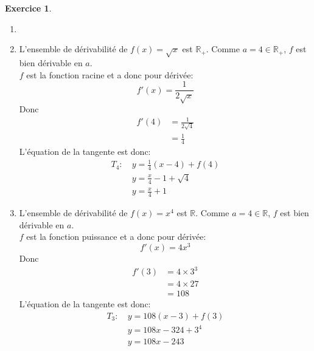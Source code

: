 \documentclass{exam}
\theoremstyle{definition}
\newtheorem{exercice}{Exercice}
\begin{document}
\begin{exercice}
    \begin{enumerate}
        \item[]
        \item L'ensemble de dérivabilité de $f(x) = \sqrt{x}$ est $\mathbb{R}_+$. Comme $a = 4 \in \mathbb{R}_+$, $f$ est bien dérivable en $a$.\\
        $f$ est la fonction racine et a donc pour dérivée:
        $$
            f'(x) = \frac{1}{2\sqrt{x}}
        $$
        Donc
        \begin{align*}
            f'(4) &= \frac{1}{2\sqrt{4}}\\
            &= \frac{1}{4}
        \end{align*}
        L'équation de la tangente est donc:
        \begin{align*}
            T_4:\ & y = \frac{1}{4}(x - 4) + f(4)\\
            & y = \frac{x}{4} - 1 + \sqrt{4}\\
            & y = \frac{x}{4} + 1
        \end{align*}
        \item L'ensemble de dérivabilité de $f(x) = x^4$ est $\mathbb{R}$. Comme $a = 4 \in \mathbb{R}$, $f$ est bien dérivable en $a$.\\
        $f$ est la fonction puissance et a donc pour dérivée:
        $$
            f'(x) = 4x^3
        $$
        Donc
        \begin{align*}
            f'(3) &= 4\times3^3\\
            &= 4\times27\\
            &= 108
        \end{align*}
        L'équation de la tangente est donc:
        \begin{align*}
            T_3:\ & y = 108(x - 3) + f(3)\\
            & y = 108x - 324 + 3^4\\
            & y = 108x - 243
        \end{align*}
    \end{enumerate}
\end{exercice}
\end{document}
